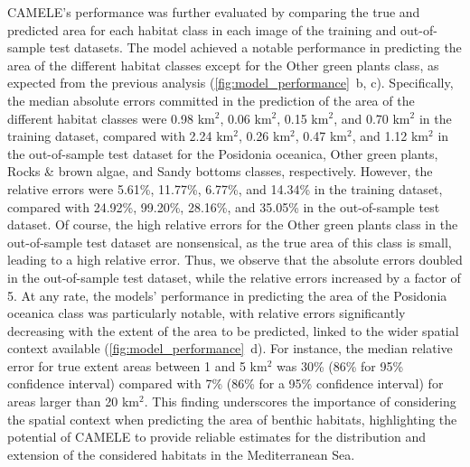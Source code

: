 CAMELE's performance was further evaluated by comparing the true and predicted
area for each habitat class in each image of the training and out-of-sample
test datasets. The model achieved a notable performance in predicting the area
of the different habitat classes except for the Other green plants class,
as expected from the previous analysis
(\cref{fig:model_performance}~\textcolor{ref_color}{b, c}).
Specifically, the median absolute errors committed in the prediction of the
area of the different habitat classes were 0.98 km$^2$, 0.06 km$^2$, 0.15
km$^2$, and 0.70 km$^2$ in the training dataset, compared with 2.24 km$^2$,
0.26 km$^2$, 0.47 km$^2$, and 1.12 km$^2$ in the out-of-sample test dataset
for the Posidonia oceanica, Other green plants, Rocks \& brown algae,
and Sandy bottoms classes, respectively. However, the relative errors
were 5.61\%, 11.77\%, 6.77\%, and 14.34\% in the training dataset, compared
with 24.92\%, 99.20\%, 28.16\%, and 35.05\% in the out-of-sample test dataset.
Of course, the high relative errors for the Other green plants
class in the out-of-sample test dataset are nonsensical, as the true area of
this class is small, leading to a high relative error. Thus, we observe
that the absolute errors doubled in the out-of-sample test dataset, while the
relative errors increased by a factor of 5. At any rate, the models'
performance in predicting the area of the Posidonia oceanica class was
particularly notable, with relative errors significantly decreasing with
the extent of the area to be predicted, linked to the wider spatial context
available (\cref{fig:model_performance}~\textcolor{ref_color}{d}). For
instance, the median relative
error for true extent areas between 1 and 5 km$^2$ was 30\% (86\% for 95\%
confidence interval) compared with 7\% (86\% for a 95\% confidence interval)
for areas larger than 20 km$^2$.  This finding underscores the importance of
considering the spatial context when predicting the area of benthic habitats,
highlighting the potential of CAMELE to provide reliable estimates for the
distribution and extension of the considered habitats in the Mediterranean Sea.

